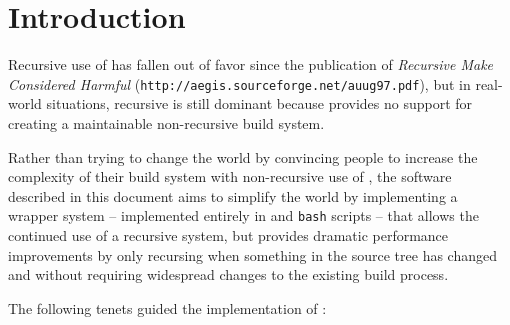 %
%
%
%
\chapter{Introduction}

Recursive use of \make has fallen out of favor since the publication
of \emph{Recursive Make Considered Harmful}
(\texttt{http://aegis.sourceforge.net/auug97.pdf}), but in real-world
situations, recursive \make is still dominant because \make provides
no support for creating a maintainable non-recursive build system.

Rather than trying to change the world by convincing people to
increase the complexity of their build system with non-recursive use
of \make, the software described in this document aims to simplify the
world by implementing a wrapper system -- implemented entirely in
\gnumake and \texttt{bash} scripts -- that allows the continued use of
a recursive \make system, but provides dramatic performance
improvements by only recursing when something in the source tree has
changed and without requiring widespread changes to the existing build
process.

The following tenets guided the implementation of \lmsbw:

